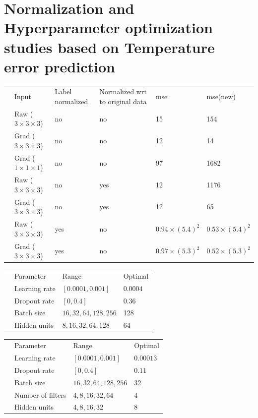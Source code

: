 \documentclass{article}
\begin{document}
\section{Normalization and Hyperparameter optimization studies based on Temperature error prediction}

\begin{table}
\centering
\begin{tabular}{llllll}
 &Input  &Label normalized   &Normalized wrt to original data &mse &mse(new)   \\
 &Raw ($3 \times 3 \times 3$)  &no  &no  &15  &154 \\
 &Grad ($3 \times 3 \times 3$) &no  &no  &12  &14\\
 &Grad ($1 \times 1 \times 1$) &no  &no  &97  &1682\\
 &Raw ($3 \times 3 \times 3$)  &no  &yes &12  &1176 \\
 &Grad ($3 \times 3 \times 3$) &no  &yes &12  &65\\
 &Raw ($3 \times 3 \times 3$)  &yes &no &$0.94 \times (5.4)^2$  &$0.53 \times (5.4)^2$ \\
 &Grad ($3 \times 3 \times 3$) &yes  &no &$0.97 \times (5.3)^2$  &$0.52 \times (5.3)^2$ \\
\end{tabular}
\end{table}

\begin{table}
\centering
\begin{tabular}{llll}
 &Parameter  &Range   &Optimal    \\
 &Learning rate  &$[0.0001,0.001]$  &$0.0004$  \\
 &Dropout rate   &$[0,0.4]$  &$0.36$  \\
 &Batch size &${16,32,64,128,256}$  &128  \\
 &Hidden units & ${8,16,32,64,128}$  &64 \\
\end{tabular}
\end{table}

\begin{table}
\centering
\begin{tabular}{llll}
 &Parameter  &Range   &Optimal    \\
 &Learning rate  &$[0.0001,0.001]$  &$0.00013$  \\
 &Dropout rate   &$[0,0.4]$  &$0.11$  \\
 &Batch size &${16,32,64, 128,256}$  &32  \\
 &Number of filters & ${4,8,16,32,64}$  &4 \\
 &Hidden units & ${4,8,16,32}$  &8 \\
\end{tabular}
\end{table}
\end{document}
